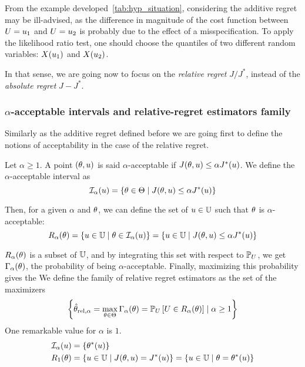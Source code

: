 \documentclass[../../Main_ManuscritThese.tex]{subfiles}
\begin{document}
From the example developed~\cref{tab:hyp_situation}, considering the additive regret may be ill-advised, as the difference in magnitude of the cost function between $U = u_1$ and $U = u_2$ is probably due to the effect of a misspecification. To apply the likelihood ratio test, one should choose the quantiles of two different random variables: $X(u_1)$ and $ X(u_2)$.

In that sense, we are going now to focus on the \emph{relative regret} $J/J^*$, instead of the \emph{absolute regret} $J - J^*$.

\subsubsection{$\alpha$-acceptable intervals and relative-regret estimators family}
Similarly as the additive regret defined before we are going first to define the notions of acceptability in the case of the relative regret.
\begin{definition}
  Let $\alpha\geq 1$.
  A point $(\theta, u)$ is said $\alpha$-acceptable if $J(\theta, u) \leq \alpha J^*(u)$.
  We define the $\alpha$-acceptable interval as
  \begin{equation}
    \mathcal{I}_{\alpha}(u) = \left\{\theta \in \Theta \mid J(\theta,u) \leq \alpha J^*(u) \right\}
  \end{equation}

Then, for a given $\alpha$ and $\theta$, we can define the set of $u\in \mathbb{U}$ such that $\theta$ is $\alpha$-acceptable:
\begin{equation}
  R_{\alpha}(\theta) = \left\{u \in \mathbb{U} \mid \theta \in \mathcal{I}_{\alpha}(u) \right\} = \left\{u \in \mathbb{U} \mid  J(\theta, u) \leq \alpha J^*(u) \right\}
\end{equation}

\end{definition}
$R_{\alpha}(\theta)$ is a  subset of $\mathbb{U}$, and by integrating this set with respect to $\mathbb{P}_U$, we get $\Gamma_{\alpha}(\theta)$, the probability of being $\alpha$-acceptable.
Finally, maximizing this probability gives the 
We define the family of relative regret estimators as the set of the maximizers
\begin{equation}
      \left\{\hat{\theta}_{\mathrm{rel,\alpha}} = \max_{\theta\in\Theta} \Gamma_{\alpha}(\theta)= \mathbb{P}_U\left[U \in R_{\alpha}(\theta)\right]\mid \alpha \geq 1\right\}
    \end{equation}
One remarkable value for $\alpha$ is $1$. 
\begin{align}
  \mathcal{I}_{\alpha}(u) &= \{\theta^*(u)\} \\
  R_1(\theta) &= \left\{u\in\mathbb{U} \mid J(\theta, u) = J^*(u)\right\} = \left\{u\in\mathbb{U} \mid \theta = \theta^*(u)\right\}
\end{align}
\end{document}
